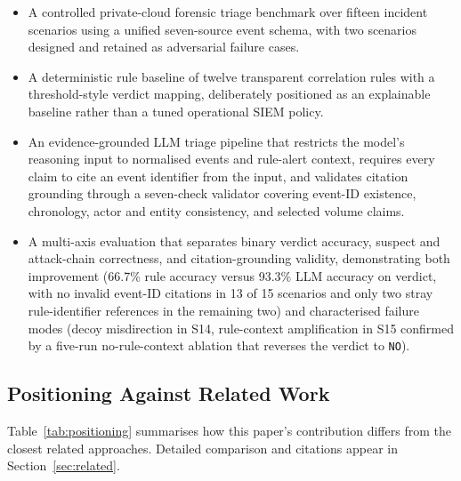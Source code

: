 \documentclass[conference]{IEEEtran}
\begin{document}
\begin{itemize}
  \item A controlled private-cloud forensic triage benchmark over fifteen incident scenarios using a unified seven-source event schema, with two scenarios designed and retained as adversarial failure cases.
  \item A deterministic rule baseline of twelve transparent correlation rules with a threshold-style verdict mapping, deliberately positioned as an explainable baseline rather than a tuned operational SIEM policy.
  \item An evidence-grounded LLM triage pipeline that restricts the model's reasoning input to normalised events and rule-alert context, requires every claim to cite an event identifier from the input, and validates citation grounding through a seven-check validator covering event-ID existence, chronology, actor and entity consistency, and selected volume claims.
  \item A multi-axis evaluation that separates binary verdict accuracy, suspect and attack-chain correctness, and citation-grounding validity, demonstrating both improvement (66.7\% rule accuracy versus 93.3\% LLM accuracy on verdict, with no invalid event-ID citations in 13 of 15 scenarios and only two stray rule-identifier references in the remaining two) and characterised failure modes (decoy misdirection in S14, rule-context amplification in S15 confirmed by a five-run no-rule-context ablation that reverses the verdict to \texttt{NO}).
\end{itemize}

\subsection{Positioning Against Related Work}
\label{sec:positioning}

Table~\ref{tab:positioning} summarises how this paper's contribution differs from the closest related approaches. Detailed comparison and citations appear in Section~\ref{sec:related}.
\end{document}
